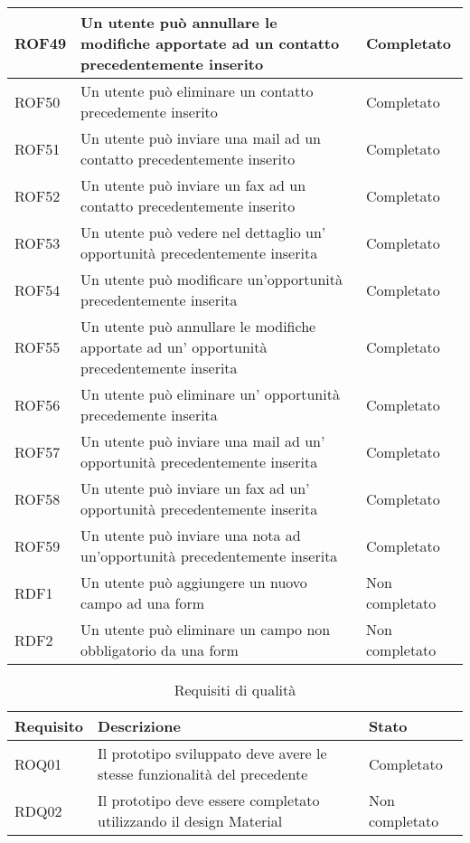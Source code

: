 \begin{longtable}[H]{|p{3cm}|p{8cm}|p{3cm}|}
	ROF49&Un utente può annullare le modifiche apportate ad un contatto precedentemente inserito&Completato\\
	\hline
	\rule[-3mm]{0mm}{0.8cm}
	ROF50&Un utente può eliminare un contatto precedemente inserito&Completato\\
	\hline
	\rule[-3mm]{0mm}{0.8cm}
	ROF51&Un utente può inviare una mail ad un contatto precedentemente inserito&Completato \\
	\hline
	\rule[-3mm]{0mm}{0.8cm}
	ROF52&Un utente può inviare un fax ad un contatto precedentemente inserito&Completato \\
	\hline
	\rule[-3mm]{0mm}{0.8cm}
	ROF53&Un utente può vedere nel dettaglio un' opportunità precedentemente inserita&Completato\\
	\hline
	ROF54&Un utente può modificare un'opportunità precedentemente inserita&Completato\\
	\hline
	\rule[-3mm]{0mm}{0.8cm}
	ROF55&Un utente può annullare le modifiche apportate ad un' opportunità precedentemente inserita&Completato\\
	\hline
	\rule[-3mm]{0mm}{0.8cm}
	ROF56&Un utente può eliminare un' opportunità precedemente inserita&Completato\\
	\hline
	\rule[-3mm]{0mm}{0.8cm}
	ROF57&Un utente può inviare una mail ad un' opportunità precedentemente inserita&Completato \\
	\hline
	\rule[-3mm]{0mm}{0.8cm}
	ROF58&Un utente può inviare un fax ad un' opportunità precedentemente inserita&Completato \\
	\hline
	\rule[-3mm]{0mm}{0.8cm}
	ROF59&Un utente può inviare una nota ad un'opportunità precedentemente inserita& Completato\\
	\hline
	\rule[-3mm]{0mm}{0.8cm}
	RDF1&Un utente può aggiungere un nuovo campo ad una form&Non completato\\
	\hline
	\rule[-3mm]{0mm}{0.8cm}
	RDF2&Un utente può eliminare un campo non obbligatorio da una form& Non completato \\
	\hline
	
\end{longtable}


\begin{table} %
	\centering
	\caption{Requisiti di qualità}
	\label{tab:requisiti-di-qualità}
	\begin{tabular}{|p{3cm}|p{8cm}|p{3cm}|}
		\hline
		\rule[-4mm]{0mm}{1cm}
		Requisito & Descrizione & Stato\\
		\hline
		\rule[-3mm]{0mm}{0.8cm}
		ROQ01&Il prototipo sviluppato deve avere le stesse funzionalità del precedente&Completato\\
		\hline
		\rule[-3mm]{0mm}{0.8cm}
		RDQ02&Il prototipo deve essere completato utilizzando il design Material&Non completato\\
		\hline	
	\end{tabular}
\end{table}

